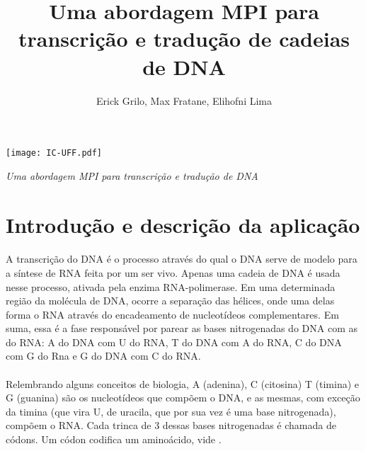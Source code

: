 \documentclass[a4paper,10pt]{article}
\title{Uma abordagem MPI para transcrição e tradução de cadeias de DNA}
\author{Erick Grilo, Max Fratane, Elihofni Lima}
\begin{document}
\begin{flushright}
\thispagestyle{empty}
\texttt{[image: IC-UFF.pdf]}
\end{flushright}

\begin{center}
\vfill
\vspace{-7em}
\emph{\Large Uma abordagem MPI para transcrição e tradução de DNA}
\begin{flushright}
\vspace{1em}
\end{flushright}
\vfill
\end{center}

\newpage
\newpage

\section{Introdução e descrição da aplicação}
\paragraph{}A transcrição do DNA é o processo através do qual o DNA serve de modelo para a síntese de RNA feita por um ser vivo. Apenas uma cadeia de DNA é usada nesse processo, ativada pela enzima RNA-polimerase. Em uma determinada região da molécula de DNA, ocorre a separação das hélices, onde uma delas forma o RNA através do encadeamento de nucleotídeos complementares. Em suma, essa é a fase responsável por parear as bases nitrogenadas do DNA com as do RNA: A do DNA com U do RNA, T do DNA com A do RNA, C do DNA com G do Rna e G do DNA com C do RNA.

\paragraph{}Relembrando alguns conceitos de biologia, A (adenina), C (citosina) T (timina) e G (guanina) são os nucleotídeos que compõem o DNA, e as mesmas, com exceção da timina (que vira U, de uracila, que por sua vez é uma base nitrogenada), compõem o RNA. Cada trinca de 3 dessas bases nitrogenadas é chamada de códons. Um códon codifica um aminoácido, vide \citet{objetivo}.
\end{document}
